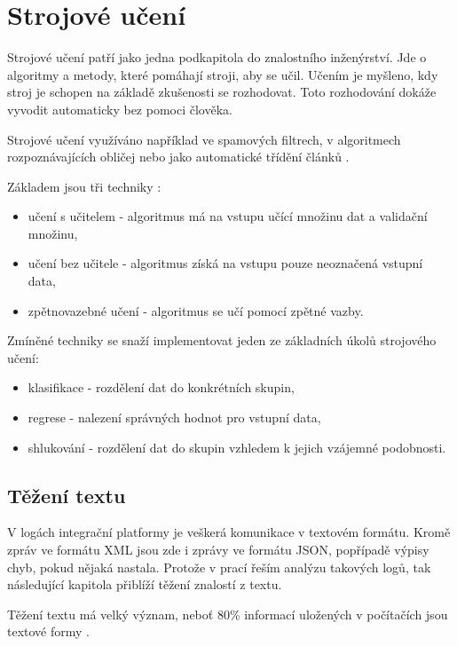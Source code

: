 \documentclass[thesis=M,czech]{FITthesis}[2012/10/20]
\begin{document}
	\section{Strojové učení}
		Strojové učení patří jako jedna podkapitola do znalostního inženýrství. Jde o algoritmy a metody, které pomáhají stroji, aby se učil. Učením je myšleno, kdy stroj je schopen na základě zkušenosti se rozhodovat. Toto rozhodování dokáže vyvodit automaticky bez pomoci člověka. \cite{what-is-machine-learning}
		
		Strojové učení využíváno například ve spamových filtrech, v algoritmech rozpoznávajících obličej nebo jako automatické třídění článků \cite{machine-learning}.
		
		Základem jsou tři techniky \cite{machin-learning-and-opt}:
		
			\begin{itemize} 
				\item učení s učitelem - algoritmus má na vstupu učící množinu dat a validační množinu,
				\item učení bez učitele - algoritmus získá na vstupu pouze neoznačená vstupní data,
				\item zpětnovazebné učení - algoritmus se učí pomocí zpětné vazby.
			\end{itemize}
		
		Zmíněné techniky se snaží implementovat jeden ze základních úkolů strojového učení:
			\begin{itemize} 
				\item klasifikace - rozdělení dat do konkrétních skupin,
				\item regrese - nalezení správných hodnot pro vstupní data,
				\item shlukování - rozdělení dat do skupin vzhledem k jejich vzájemné podobnosti.
			\end{itemize}
			
	\subsection{Těžení textu}
		V logách integrační platformy je veškerá komunikace v textovém formátu. Kromě zpráv ve formátu XML jsou zde i zprávy ve formátu JSON, popřípadě výpisy chyb, pokud nějaká nastala. Protože v prací řeším analýzu takových logů, tak následující kapitola přiblíží těžení znalostí z textu. 
		
		Těžení textu má velký význam, neboť 80\% informací uložených v počítačích jsou textové formy \cite{IRWebTechniques}.
		
\end{document}
